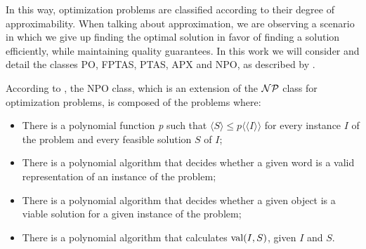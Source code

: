 
In this way, optimization problems are classified according to their degree of approximability. When talking about approximation, we are observing a scenario in which we give up finding the optimal solution in favor of finding a solution efficiently, while maintaining quality guarantees. In this work we will consider and detail the classes PO, FPTAS, PTAS, APX and NPO, as described by \cite{bookAprox}.


According to \citeauthor{bookAprox}, the NPO class, which is an extension of the \(\mathcal{NP}\) class for optimization problems, is composed of the problems where:

\begin{itemize}
    \item There is a polynomial function \textit{p} such that \(\langle S \rangle \leq p\langle\langle I\rangle\rangle\) for every instance \(I\) of the problem and every feasible solution \( S\) of \(I\);
    \item There is a polynomial algorithm that decides whether a given word is a valid representation of an instance of the problem;
    \item There is a polynomial algorithm that decides whether a given object is a viable solution for a given instance of the problem;
    \item There is a polynomial algorithm that calculates \(\operatorname{\textrm{val}}(I, S)\), given \(I\) and \(S\).
\end{itemize}


